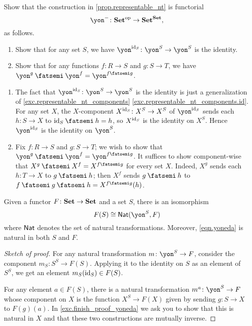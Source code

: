 \documentclass[Book-Poly]{subfiles}
\begin{document}
\begin{exercise} \label{exc.representable_nt_functorial}
Show that the construction in \cref{prop.representable_nt} is functorial
\begin{equation}
\yon^-\colon\smset\op\to\smset^\smset,
\end{equation}
as follows.
\begin{enumerate}
	\item Show that for any set $S$, we have $\yon^{\id_S}\colon\yon^S\to\yon^S$ is the identity.
	\item Show that for any functions $f\colon R\to S$ and $g\colon S\to T$, we have $\yon^g\then\yon^f=\yon^{f\then g}$.
\qedhere
\end{enumerate}

\begin{solution}
\begin{enumerate}
    \item The fact that $\yon^{\id_S}\colon\yon^S\to\yon^S$ is the identity is just a generalization of \cref{exc.representable_nt_components} \cref{exc.representable_nt_components.id}.
    For any set $X$, the $X$-component $X^{\mathrm{id}_S} \colon X^S \to X^S$ of $\yon^{\id_S}$ sends each $h \colon S \to X$ to $\id_S \then h = h$, so $X^{\mathrm{id}_S}$ is the identity on $X^S$.
    Hence $\yon^{\id_S}$ is the identity on $\yon^S$.
    \item Fix $f \colon R \to S$ and $g \colon S \to T$; we wish to show that $\yon^g \then \yon^f = \yon^{f \then g}$.
    It suffices to show component-wise that $X^g \then X^f = X^{f \then g}$ for every set $X$.
    Indeed, $X^g$ sends each $h \colon T \to X$ to $g \then h$; then $X^f$ sends $g \then h$ to $f \then g \then h = X^{f \then g}(h)$.
\end{enumerate}
\end{solution}
\end{exercise}

\begin{lemma}\label{lemma.yoneda}
Given a functor $F\colon\textbf{Set}\to\textbf{Set}$ and a set $S$, there is an isomorphism
\begin{equation}\label{eqn.yoneda}
F(S)\cong\nat(\yon^S,F)
\end{equation}
where $\mathsf{Nat}$ denotes the set of natural transformations. Moreover, \eqref{eqn.yoneda} is natural in both $S$ and $F$.
\end{lemma}
\begin{proof}[Sketch of proof]
For any natural transformation $m\colon\yon^S\to F$, consider the component $m_S\colon S^S\to F(S)$. Applying it to the identity on $S$ as an element of $S^S$, we get an element $m_S(\mathrm{id}_S)\in F(S)$.

For any element $a\in F(S)$, there is a natural transformation $m^a\colon\yon^S\to F$ whose component on $X$ is the function $X^S\to F(X)$ given by sending $g\colon S\to X$ to $F(g)(a)$. In \cref{exc.finish_proof_yoneda} we ask you to show that this is natural in $X$ and that these two constructions are mutually inverse.
\end{proof}
\end{document}
